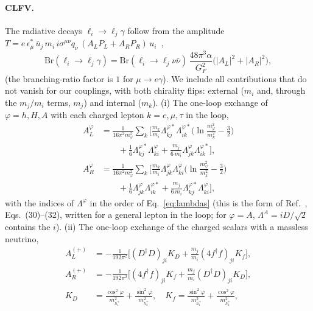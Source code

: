 \documentclass[twocolumn,epjc3]{svjour3}
\newcommand{\Br}{\mathrm{Br}}
\begin{document}
\paragraph{CLFV.} The radiative decays $\ell_i\to\ell_j\gamma$ follow from the amplitude $T=e\,\epsilon^*_\mu\,\bar u_j\,m_i\,i\sigma^{\mu\nu}q_\nu\,(A_LP_L+A_RP_R)\,u_i$~\cite{Omura:2015nja},
\begin{equation}
\Br(\ell_i\to\ell_j\gamma)=\Br(\ell_i\to\ell_j\nu\bar\nu)\,\frac{48\pi^3\alpha}{G_F^2}\big(|A_L|^2+|A_R|^2\big),
\end{equation}
(the branching-ratio factor is $1$ for $\mu\to e\gamma$). We include all contributions that do not vanish for our couplings, with both chirality flips: external ($m_i$ and, through the $m_j/m_i$ terms, $m_j$) and internal ($m_k$). (i) The one-loop exchange of $\varphi=h,H,A$ with each charged lepton $k=e,\mu,\tau$ in the loop,
\begin{align}
A_L^\varphi&=\frac{1}{16\pi^2m_\varphi^2}\sum_k\Big[\frac{m_k}{m_i}\Lambda^{\varphi*}_{kj}\Lambda^{\varphi*}_{ik}\Big(\ln\frac{m_\varphi^2}{m_k^2}-\frac32\Big)\nonumber\\&\qquad+\frac16\Lambda^{\varphi*}_{kj}\Lambda^\varphi_{ki}+\frac{m_j}{6\,m_i}\Lambda^{\varphi}_{jk}\Lambda^{\varphi*}_{ik}\Big],\nonumber\\
A_R^\varphi&=\frac{1}{16\pi^2m_\varphi^2}\sum_k\Big[\frac{m_k}{m_i}\Lambda^{\varphi}_{jk}\Lambda^{\varphi}_{ki}\Big(\ln\frac{m_\varphi^2}{m_k^2}-\frac32\Big)\nonumber\\&\qquad+\frac16\Lambda^{\varphi}_{jk}\Lambda^{\varphi*}_{ik}+\frac{m_j}{6\,m_i}\Lambda^{\varphi*}_{kj}\Lambda^{\varphi}_{ki}\Big],
\label{eq:dipole}
\end{align}
with the indices of $\Lambda^\varphi$ in the order of Eq.~\eqref{eq:lambdas} (this is the form of Ref.~\cite{Omura:2015nja}, Eqs.~(30)--(32), written for a general lepton in the loop; for $\varphi=A$, $\Lambda^A=iD/\sqrt2$ contains the $i$). (ii) The one-loop exchange of the charged scalars with a massless neutrino,
\begin{align}
A_L^{(+)}&=-\frac{1}{192\pi^2}\Big[(D^\dagger D)_{ji}K_D+\frac{m_j}{m_i}(4f^\dagger f)_{ji}K_f\Big],\nonumber\\
A_R^{(+)}&=-\frac{1}{192\pi^2}\Big[(4f^\dagger f)_{ji}K_f+\frac{m_j}{m_i}(D^\dagger D)_{ji}K_D\Big],\nonumber\\
K_D&=\frac{\cos^2\varphi}{m^2_{h_1^+}}+\frac{\sin^2\varphi}{m^2_{h_2^+}},\quad K_f=\frac{\sin^2\varphi}{m^2_{h_1^+}}+\frac{\cos^2\varphi}{m^2_{h_2^+}},
\end{align}
\end{document}
